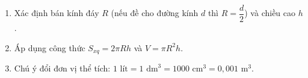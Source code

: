 \begin{enumerate}
\item Xác định bán kính đáy $R$ (nếu đề cho đường kính $d$ thì $R = \dfrac{d}{2}$) và chiều cao $h$.
\item Áp dụng công thức $S_{xq} = 2\pi R h$ và $V = \pi R^2 h$.
\item Chú ý đổi đơn vị thể tích: $1\text{ lít} = 1\text{ dm}^3 = 1000\text{ cm}^3 = 0{,}001\text{ m}^3$.
\end{enumerate}
